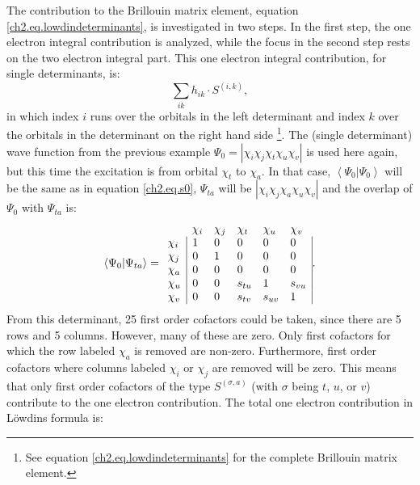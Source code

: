 The contribution to the Brillouin matrix element, equation \ref{ch2.eq.lowdindeterminants}, is investigated in two steps. In the first step, the one electron integral contribution is analyzed, while the focus in the second step rests on the two electron integral part. This one electron integral contribution, for single determinants, is:
\begin{equation}
\sum_{ik} h_{ik} \cdot S^{(i,k)},
\label{ch2.eq.ta_1el1}
\end{equation}
in which index $i$ runs over the orbitals in the left determinant and index $k$ over the orbitals in the determinant on the right hand side \footnote{See equation \ref{ch2.eq.lowdindeterminants} for the complete Brillouin matrix element.}. The (single determinant) wave function from the previous example $\Psi_0 = |\chi_i\chi_j\chi_t\chi_u\chi_v|$ is used here again, but this time the excitation is from orbital $\chi_t$ to $\chi_a$. In that case, $\left< \Psi_0 | \Psi_0 \right>$ will be the same as in equation \ref{ch2.eq.s0}, $\Psi_{ta}$ will be $|\chi_i\chi_j\chi_a\chi_u\chi_v|$ and the overlap of $\Psi_0$ with $\Psi_{ta}$ is:
\begin{equation}
\left < \Psi_0 | \Psi_{ta} \right > = 
\begin{array}{llllll}
 &  \chi_i & \chi_j & \chi_t & \chi_u & \chi_v \\
 \chi_i & \multicolumn{1}{|l}{ 1 } & 0 & 0 & 0 & \multicolumn{1}{l|}{ 0 } \\
 \chi_j & \multicolumn{1}{|l}{ 0 } & 1 & 0 & 0 & \multicolumn{1}{l|}{ 0 } \\
 \chi_a & \multicolumn{1}{|l}{ 0 } & 0 & 0 & 0 & \multicolumn{1}{l|}{ 0 } \\
 \chi_u & \multicolumn{1}{|l}{ 0 } & 0 & s_{tu} & 1 & \multicolumn{1}{l|}{s_{vu}} \\
 \chi_v & \multicolumn{1}{|l}{ 0 } & 0 & s_{tv} & s_{uv} & \multicolumn{1}{l|}{1}
\end{array}.
\label{ch2.eq.psi0_ta}
\end{equation}
From this determinant, 25 first order cofactors could be taken, since there are 5 rows and 5 columns. However, many of these are zero. Only first cofactors for which the row labeled $\chi_a$ is removed are non-zero. Furthermore, first order cofactors where columns labeled $\chi_i$ or $\chi_j$ are removed will be zero. This means that only first order cofactors of the type $S^{(\sigma,a)}$ (with $\sigma$ being $t$, $u$, or $v$) contribute to the one electron contribution. The total one electron contribution in L\"{o}wdins formula is:

